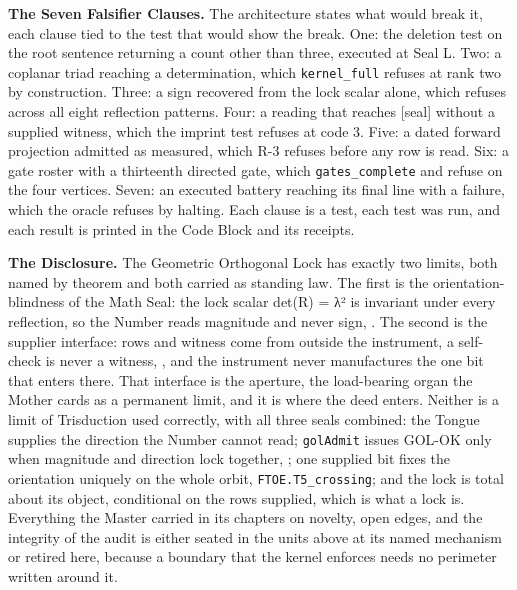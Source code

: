 \documentclass[10pt,twocolumn]{article}
\begin{document}
\textbf{The Seven Falsifier Clauses.} The architecture states what would
break it, each clause tied to the test that would show the break. One:
the deletion test on the root sentence returning a count other than
three, executed at Seal L. Two: a coplanar triad reaching a
determination, which \texttt{kernel\_full} refuses at rank two by
construction. Three: a sign recovered from the lock scalar alone, which
\texttt{} refuses across all eight
reflection patterns. Four: a reading that reaches {[}seal{]} without a
supplied witness, which the imprint test refuses at code 3. Five: a
dated forward projection admitted as measured, which R-3 refuses before
any row is read. Six: a gate roster with a thirteenth directed gate,
which \texttt{gates\_complete} and
\texttt{} refuse on the four vertices.
Seven: an executed battery reaching its final line with a failure, which
the oracle refuses by halting. Each clause is a test, each test was run,
and each result is printed in the Code Block and its receipts.

\textbf{The Disclosure.} The Geometric Orthogonal Lock has exactly two
limits, both named by theorem and both carried as standing law. The
first is the orientation-blindness of the Math Seal: the lock scalar
det(R) = λ² is invariant under every reflection, so the Number reads
magnitude and never sign,
\texttt{}. The second is
the supplier interface: rows and witness come from outside the
instrument, a self-check is never a witness,
\texttt{}, and the instrument
never manufactures the one bit that enters there. That interface is the
aperture, the load-bearing organ the Mother cards as a permanent limit,
and it is where the deed enters. Neither is a limit of Trisduction used
correctly, with all three seals combined: the Tongue supplies the
direction the Number cannot read; \texttt{golAdmit} issues GOL-OK only
when magnitude and direction lock together,
\texttt{}; one supplied bit
fixes the orientation uniquely on the whole orbit,
\texttt{FTOE.T5\_crossing}; and the lock is total about its object,
conditional on the rows supplied, which is what a lock is. Everything
the Master carried in its chapters on novelty, open edges, and the
integrity of the audit is either seated in the units above at its named
mechanism or retired here, because a boundary that the kernel enforces
needs no perimeter written around it.
\end{document}
